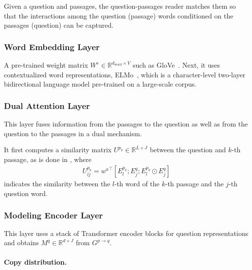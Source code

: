 \documentclass[11pt,a4paper]{article}
\theoremstyle{mydef}
\theoremstyle{myprob}
\begin{document}
Given a question and  passages, the question-passages reader matches them so that the interactions among the question (passage) words conditioned on the passages (question) can be captured.

\subsubsection{Word Embedding Layer}

A pre-trained weight matrix $W^e \in \mathbb{R}^{d_\mathrm{word} \times V}$ such as GloVe~\citep{PenningtonSM14}. Next, it uses contextualized word representations, ELMo~\citep{PetersNIGCLZ18}, which is a character-level two-layer bidirectional language model pre-trained on a large-scale corpus. 

\subsubsection{Dual Attention Layer}
\label{sec:dual}

This layer fuses information from the passages to the question as well as from the question to the passages in a dual mechanism. 

It first computes a similarity matrix $U^{p_k} \in \mathbb{R}^{L{\times}J}$ between the question and $k$-th passage, as is done in \citep{SeoKFH17}, where
\begin{align}
U^{p_k}_{lj} = {w^a}^\top [ E^{p_k}_l; E^q_j; E^{p_k}_l \odot E^q_j ]
\end{align}
indicates the similarity between the $l$-th word of the $k$-th passage and the $j$-th question word. 

\subsubsection{Modeling Encoder Layer}

This layer uses a stack of Transformer encoder blocks for question representations and obtains $M^q \in \mathbb{R}^{d \times J}$ from $G^{p \rightarrow q}$. 

\paragraph{Copy distribution.}
\end{document}
